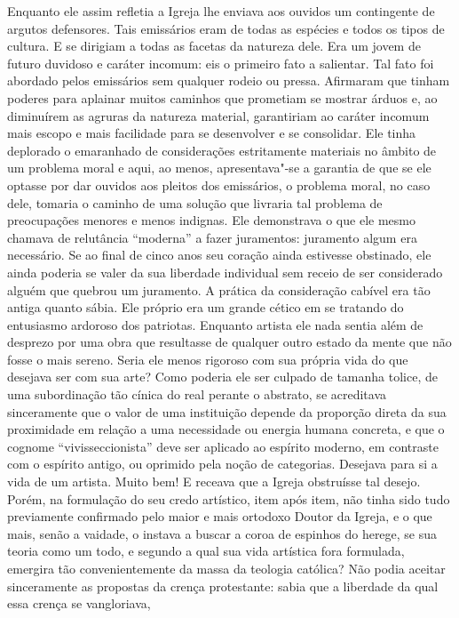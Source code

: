 Enquanto ele assim refletia a Igreja lhe enviava aos ouvidos um
contingente de argutos defensores.  Tais emissários eram de todas as
espécies e todos os tipos de cultura.  E se dirigiam a todas as facetas
da natureza dele.  Era um jovem de futuro duvidoso e caráter incomum:
eis o primeiro fato a salientar.  Tal fato foi abordado pelos
emissários sem qualquer rodeio ou pressa.  Afirmaram que tinham poderes
para aplainar muitos caminhos que prometiam se mostrar árduos e, ao
diminuírem as agruras da natureza material, garantiriam ao caráter
incomum mais escopo e mais facilidade para se desenvolver e se
consolidar.  Ele tinha deplorado o emaranhado de considerações
estritamente materiais no âmbito de um problema moral e aqui, ao menos,
apresentava"-se a garantia de que se ele optasse por dar ouvidos aos
pleitos dos emissários, o problema moral, no caso dele, tomaria o
caminho de uma solução que livraria tal problema de preocupações
menores e menos indignas.  Ele demonstrava o que ele mesmo chamava de
relutância “moderna” a fazer juramentos: juramento algum era
necessário.  Se ao final de cinco anos seu coração ainda estivesse
obstinado, ele ainda poderia se valer da sua liberdade individual sem
receio de ser considerado alguém que quebrou um juramento.  A prática
da consideração cabível era tão antiga quanto sábia.  Ele próprio era
um grande cético em se tratando do entusiasmo ardoroso dos patriotas. 
Enquanto artista ele nada sentia além de desprezo por uma obra que
resultasse de qualquer outro estado da mente que não fosse o mais
sereno.  Seria ele menos rigoroso com sua própria vida do que desejava
ser com sua arte?  Como poderia ele ser culpado de tamanha tolice, de
uma subordinação tão cínica do real perante o abstrato, se acreditava
sinceramente que o valor de uma instituição depende da proporção direta
da sua proximidade em relação a uma necessidade ou energia humana
concreta, e que o cognome “vivisseccionista” deve ser aplicado ao
espírito moderno, em contraste com o espírito antigo, ou oprimido pela
noção de categorias.  Desejava para si a vida de um artista.  Muito
bem!  E receava que a Igreja obstruísse tal desejo.  Porém, na
formulação do seu credo artístico, item após item, não tinha sido tudo
previamente confirmado pelo maior e mais ortodoxo Doutor da Igreja, e o
que mais, senão a vaidade, o instava a buscar a coroa de espinhos do
herege, se sua teoria como um todo, e segundo a qual sua vida artística
fora formulada, emergira tão convenientemente da massa da teologia
católica?  Não podia aceitar sinceramente as propostas da crença
protestante: sabia que a liberdade da qual essa crença se vangloriava,
